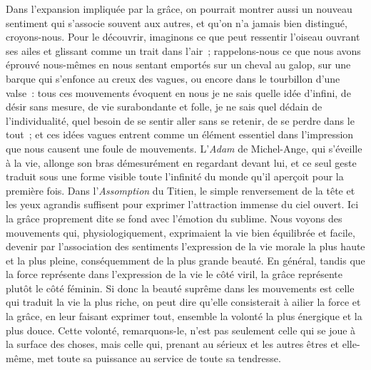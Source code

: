 \documentclass[french,twoside]{book} %
\begin{document}
Dans l’expansion impliquée par la grâce, on pourrait montrer aussi un nouveau sentiment qui s’associe souvent aux autres, et qu’on n’a jamais bien distingué, croyons-nous. Pour le découvrir, imaginons ce que peut ressentir l’oiseau ouvrant ses ailes et glissant comme un trait dans l’air ; rappelons-nous ce que nous avons éprouvé nous-mêmes en nous sentant emportés sur un cheval au galop, sur une barque qui s’enfonce au creux des vagues, ou encore dans le tourbillon d’une valse : tous ces mouvements évoquent en nous je ne sais quelle idée d’infini, de désir sans mesure, de vie surabondante et folle, je ne sais quel dédain de l’individualité, quel besoin de se sentir aller sans se retenir, de se perdre dans le tout ; et ces idées vagues entrent comme un élément essentiel dans l’impression que nous causent une foule de mouvements. L’\emph{Adam} de Michel-Ange, qui s’éveille à la vie, allonge son bras démesurément en regardant devant lui, et ce seul geste traduit sous une forme visible toute l’infinité du monde qu’il aperçoit pour la première fois. Dans l’\emph{Assomption} du Titien, le simple renversement de la tête et les yeux agrandis suffisent pour exprimer l’attraction immense du ciel ouvert. Ici la grâce proprement dite se fond avec l’émotion du sublime. Nous voyons des mouvements qui, physiologiquement, exprimaient la vie bien équilibrée et facile, devenir par l’association des sentiments l’expression de la vie morale la plus haute et la plus pleine, conséquemment de la plus grande beauté.  En général, tandis que la force représente dans l’expression de la vie le côté viril, la grâce représente plutôt le côté féminin. Si donc la beauté suprême dans les mouvements est celle qui traduit la vie la plus riche, on peut dire qu’elle consisterait à ailier la force et la grâce, en leur faisant exprimer tout, ensemble la volonté la plus énergique et la plus douce. Cette volonté, remarquons-le, n’est pas seulement celle qui se joue à la surface des choses, mais celle qui, prenant au sérieux et les autres êtres et elle-même, met toute sa puissance au service de toute sa tendresse.\par
\end{document}
